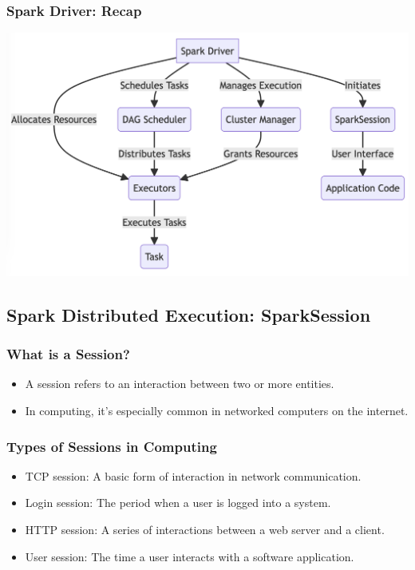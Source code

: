 \begin{frame}
    \frametitle{Spark Driver: Recap}
    \includegraphics[width=\textwidth,height=.85\textheight,keepaspectratio]{./Figures/chapter-04/Mairmaid_SparkDriver}

\end{frame}

\subsection{Spark Distributed Execution: SparkSession}\label{subsec:spark-session}
\begin{frame}
    \frametitle{What is a Session?}

    \begin{itemize}
        \item A session refers to an interaction between two or more entities.\pause
        \item In computing, it's especially common in networked computers on the internet.\pause
    \end{itemize}

\end{frame}

\begin{frame}
    \frametitle{Types of Sessions in Computing}

    \begin{itemize}
        \item TCP session: A basic form of interaction in network communication.
        \item Login session: The period when a user is logged into a system.
        \item HTTP session: A series of interactions between a web server and a client.
        \item User session: The time a user interacts with a software application.
    \end{itemize}

\end{frame}

